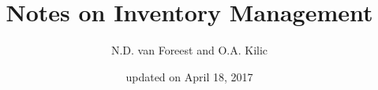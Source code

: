 \documentclass[a4paper,11pt]{scrartcl}
\title{Notes on Inventory Management}
\date{\small updated on April 18, 2017}
\author{\small N.D. van Foreest and O.A. Kilic}
\begin{document}
\maketitle
{\small \tableofcontents}

\newpage 




%
%
\end{document}
